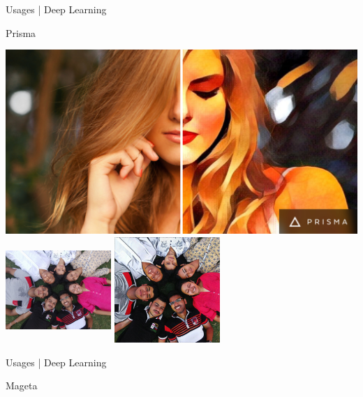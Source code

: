 \documentclass[10pt]{beamer}
\begin{document}
	\begin{frame}{Usages | Deep Learning}
		\begin{center}
			
			
			Prisma
			
			\includegraphics[scale=0.05 ]{images/somnath_13}
			\includegraphics[width=40mm,height=40mm ]{images/somnath_14}  \includegraphics[width=40mm,height=40mm  ]{images/somnath_15}
			
			
		\end{center}
	\end{frame}
	\begin{frame}{Usages | Deep Learning}
		\begin{center}
			
			
			Mageta
			
			
			
			
		\end{center}
	\end{frame}
	
\end{document}
